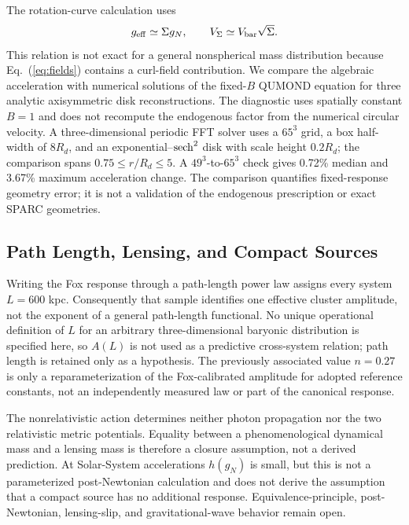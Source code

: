 \documentclass[aps,prd,reprint,superscriptaddress,showpacs,floatfix,longbibliography]{revtex4-2}
\begin{document}
The rotation-curve calculation uses
\begin{equation}
g_{\rm eff}\simeq\Sigma g_N,\qquad
V_\Sigma\simeq V_{\rm bar}\sqrt{\Sigma}.
\label{eq:algebraic}
\end{equation}
This relation is not exact for a general nonspherical mass distribution because Eq.~(\ref{eq:fields}) contains a curl-field contribution. We compare the algebraic acceleration with numerical solutions of the fixed-$B$ QUMOND equation for three analytic axisymmetric disk reconstructions. The diagnostic uses spatially constant $B=1$ and does not recompute the endogenous factor from the numerical circular velocity. A three-dimensional periodic FFT solver uses a $65^3$ grid, a box half-width of $8R_d$, and an exponential--${\rm sech}^2$ disk with scale height $0.2R_d$; the comparison spans $0.75\le r/R_d\le5$. A $49^3$-to-$65^3$ check gives 0.72\% median and 3.67\% maximum acceleration change. The comparison quantifies fixed-response geometry error; it is not a validation of the endogenous prescription or exact SPARC geometries.

\subsection{Path Length, Lensing, and Compact Sources}

Writing the Fox response through a path-length power law assigns every system $L=600$ kpc. Consequently that sample identifies one effective cluster amplitude, not the exponent of a general path-length functional. No unique operational definition of $L$ for an arbitrary three-dimensional baryonic distribution is specified here, so $A(L)$ is not used as a predictive cross-system relation; path length is retained only as a hypothesis. The previously associated value $n=0.27$ is only a reparameterization of the Fox-calibrated amplitude for adopted reference constants, not an independently measured law or part of the canonical response.

The nonrelativistic action determines neither photon propagation nor the two relativistic metric potentials. Equality between a phenomenological dynamical mass and a lensing mass is therefore a closure assumption, not a derived prediction. At Solar-System accelerations $h(g_N)$ is small, but this is not a parameterized post-Newtonian calculation and does not derive the assumption that a compact source has no additional response. Equivalence-principle, post-Newtonian, lensing-slip, and gravitational-wave behavior remain open.
\end{document}

